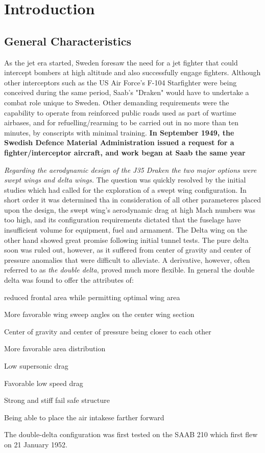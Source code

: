 \section{Introduction}

\subsection{General Characteristics}
As the jet era started, Sweden foresaw the need for a jet fighter that could intercept bombers at high 
altitude and also successfully engage fighters. Although other interceptors such as the 
US Air Force's F-104 Starfighter were being conceived during the same period, 
Saab's "Draken" would have to undertake a combat role unique to Sweden. 
Other demanding requirements were the capability to operate from reinforced public roads 
used as part of wartime airbases, and for refuelling/rearming to be 
carried out in no more than ten minutes, by conscripts with minimal training. 
\textbf{In September 1949, the Swedish Defence Material Administration issued a request for a fighter/interceptor aircraft, and work began at Saab the same year}

\textit{Regarding the aerodynamic design of the J35 Draken the two major options were swept wings and delta wings.}
The question was quickly resolved by the initial studies which had called for the
exploration of a swept wing configuration. In short order it  was determined tha
in consideration of all other parameteres placed upon the design, 
the swept wing's aerodynamic drag at high Mach numbers was too high, 
and its configuration requirements dictated that the fuselage have insufficient 
volume for equipment, fuel and armament.
The Delta wing on the other hand showed great promise following initial tunnel 
tests. The pure delta soon was ruled out, however, as it suffered from center 
of gravity and center of pressure anomalies that were difficult to alleviate. 
A derivative, however, often referred to as \textit{the double delta}, proved much more flexible. 
In general the double delta was found to offer the attributes of:
\begin{itemize*}
    \item reduced frontal area while permitting optimal wing area
    \item More favorable wing sweep angles on the center wing section
    \item Center of gravity and center of pressure being closer to each other
    \item More favorable area distribution
    \item Low supersonic drag
    \item Favorable low speed drag
    \item Strong and stiff fail safe structure
    \item Being able to place the air intakese farther forward
\end{itemize*}
The double-delta configuration was first tested on the SAAB 210 which first flew
on 21 January 1952.

